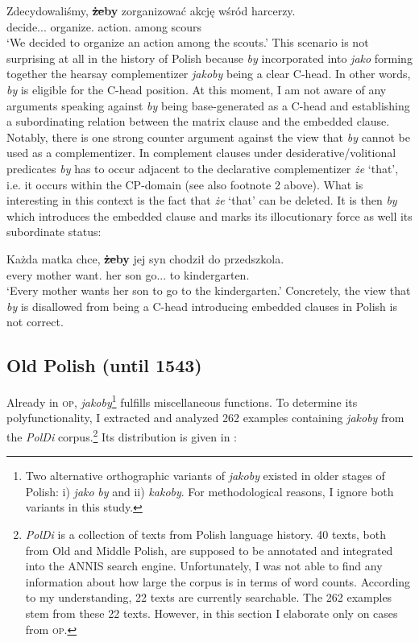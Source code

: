 \documentclass[output=paper
,modfonts
,nonflat]{langsci/langscibook}
\begin{document}
{\ea \gll Zdecydowaliśmy, \textbf{\sout{że}by} zorganizować akcję wśród harcerzy. \\
		decide.{\lptcp}.{\vir}.{\firstperson}{\pl} {\comp} organize.{\infv} action.{\acc} among scours \\
\glt	 `We decided to organize an action among the scouts.' 
\z
This scenario is not surprising at all in the history of Polish because \emph{by} incorporated into \emph{jako} forming together the hearsay complementizer \emph{jakoby} being a clear C-head. In other words, \emph{by} is eligible for the C-head position. At this moment, I am not aware of any arguments speaking against \emph{by} being base-generated as a C-head and establishing a subordinating relation between the matrix clause and the embedded clause. Notably, there is one strong counter argument against the view that \emph{by} cannot be used as a complementizer. In complement clauses under desiderative\slash volitional predicates \emph{by} has to occur adjacent to the declarative complementizer \emph{że} `that', i.e. it occurs within the CP-domain (see also footnote 2 above).  What is interesting in this context is the fact that \emph{że} `that' can be deleted. It is then \emph{by} which introduces the embedded clause and marks its illocutionary force as well its subordinate status:   

\ea \gll Każda matka chce, {\textbf{\sout{że}by}} jej syn chodził do przedszkola. \\
		every mother want.{\thirdperson}{\sg} {\comp} her son go.{\lptcp}.{\sg}.{\masc} to kindergarten.{\gen} \\
\glt	`Every mother wants her son to go to the kindergarten.'
\z
Concretely, the view that \emph{by} is disallowed from being a C-head introducing embedded clauses in Polish is not correct.
}

\subsection{Old Polish (until 1543)}

Already in \textsc{op}, \emph{jakoby}\footnote{Two alternative orthographic variants of \emph{jakoby} existed in older stages of Polish: i) \emph{jako} \emph{by} and ii) \emph{kakoby}. For methodological reasons, I ignore both variants in this study.
}
 fulfills miscellaneous functions. To determine its polyfunctionality, I extracted and analyzed 262 examples containing \emph{jakoby} from the \emph{PolDi} corpus.\footnote{\emph{PolDi} is a collection of texts from Polish language history. 40 texts, both from Old and Middle Polish, are supposed to be annotated and integrated into the ANNIS search engine. Unfortunately, I was not able to find any information about how large the corpus is in terms of word counts. According to my understanding, 22 texts are currently searchable. The 262 examples stem from these 22 texts. However, in this section I elaborate only on cases from \textsc{op}.   

}
Its distribution is given in :  
\end{document}
